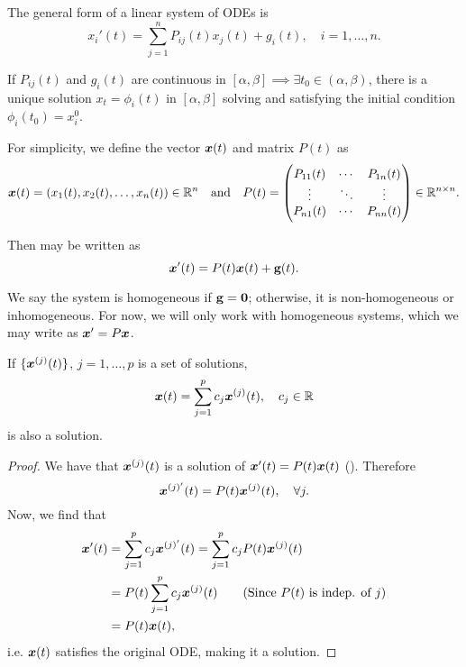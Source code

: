 The general form of a linear system of ODEs is
\begin{equation}\label{eq:linearsystem}
	x_i'(t) = \sum_{j=1}^n P_{ij}(t) x_j(t) + g_i(t), \quad i = 1,\ldots,n.
\end{equation}

\begin{theorem}
	If $P_{ij}(t)$ and $g_i(t)$ are continuous in $[\alpha, \beta] \implies \exists t_0 \in (\alpha, \beta)$, there is a unique solution $x_t = \phi_i(t)$ in $[\alpha, \beta]$ solving  and satisfying the initial condition $\phi_i(t_0) = x_i^0$.
\end{theorem}

For simplicity, we define the vector $\bm{x}(t)$ and matrix $P(t)$ as
\begin{equation}
	\bm{x}(t) = (x_1(t), x_2(t), \ldots, x_n(t)) \in \mathbb{R}^n \quad \text{and} \quad P(t) = \begin{pmatrix}P_{11}(t) & \cdots & P_{1n}(t) \\ \vdots & \ddots & \vdots \\ P_{n1}(t) & \cdots & P_{nn}(t)\end{pmatrix} \in \mathbb{R}^{n \times n}.
\end{equation}

Then  may be written as
\begin{equation}\label{eq:linearsystemvector}
	\bm{x}'(t) = P(t) \bm{x}(t) + \textbf{g}(t).
\end{equation}

We say the system is homogeneous if $\textbf{g} = \bm{0}$; otherwise, it is non-homogeneous or inhomogeneous. For now, we will only work with homogeneous systems, which we may write as $\bm{x}' = P\bm{x}$.

\begin{theorem}\label{thrm:superposition}
	If $\{\bm{x}^{(j)}(t)\}$, $j = 1, \ldots, p$ is a set of solutions,
	\begin{equation}\label{eq:gensol}
		\bm{x}(t) = \sum_{j=1}^p c_j \bm{x}^{(j)}(t), \quad c_j \in \mathbb{R}
	\end{equation}
	is also a solution.
\end{theorem}

\begin{proof}
	We have that $\bm{x}^{(j)}(t)$ is a solution of $\bm{x}'(t) = P(t) \bm{x}(t)$ (). Therefore
	\[
	\bm{x}^{(j)'}(t) = P(t) \bm{x}^{(j)}(t), \quad \forall j.
	\]
	Now, we find that
	\begin{align*}
		\bm{x}'(t) &= \sum_{j=1}^p c_j \bm{x}^{(j)'}(t)
		= \sum_{j=1}^p c_j P(t) \bm{x}^{(j)}(t) \\
		&= P(t) \sum_{j=1}^p c_j \bm{x}^{(j)}(t) \tag{Since $P(t)$ is indep. of $j$} \\
		&= P(t) \bm{x}(t),
	\end{align*}
	i.e. $\bm{x}(t)$ satisfies the original ODE, making it a solution.
\end{proof}

